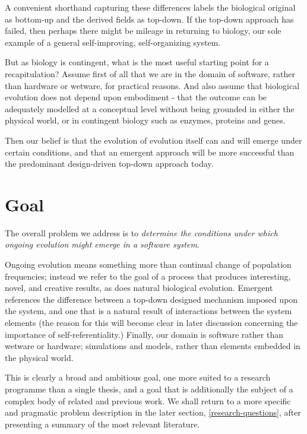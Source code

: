 \documentclass[]{report}
\begin{document}
A convenient shorthand capturing these differences labels the biological original as bottom-up and the derived fields as top-down. If the top-down approach has failed, then perhaps there might be mileage in returning to biology, our sole example of a general self-improving, self-organizing system.

But as biology is contingent, what is the most useful starting point for a recapitulation? Assume first of all that we are in the domain of software, rather than hardware or wetware, for practical reasons. And also assume that biological evolution does not depend upon embodiment - that the outcome can be adequately modelled at a conceptual level without being grounded in either the physical world, or in contingent biology such as enzymes, proteins and genes.

Then our belief is that the evolution of evolution itself can and will emerge under certain conditions, and that an emergent approach will be more successful than the predominant design-driven top-down approach today.

\section{Goal}

The overall problem we address is to \textit{determine the conditions under which ongoing evolution might emerge in a software system}. 

Ongoing evolution means something more than continual change of population frequencies; instead we refer to the goal of a process that produces interesting, novel, and creative results, as does natural biological evolution. Emergent references the difference between a top-down designed mechanism imposed upon the system, and one that is a natural result of interactions between the system elements (the reason for this will become clear in later discussion concerning the importance of self-referentiality.) Finally, our domain is software rather than wetware or hardware; simulations and models, rather than elements embedded in the physical world.

This is clearly a broad and ambitious goal, one more suited to a research programme than a single thesis, and a goal that is additionally the subject of a complex body of related and previous work. We shall return to a more specific and pragmatic problem description in the later section, \ref{research-questions}, after presenting a summary of the most relevant literature.
\end{document}
